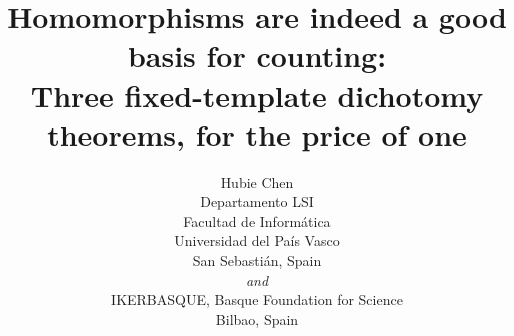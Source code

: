 \documentclass[11pt]{article}
\begin{document}
\title{Homomorphisms are indeed a good basis for counting:\\Three fixed-template dichotomy theorems, for the price of one}



\author{Hubie Chen\\
Departamento LSI\\
Facultad de Inform\'{a}tica\\
Universidad del Pa\'{i}s Vasco\\
San Sebasti\'{a}n, Spain\\
\emph{and}\\
 IKERBASQUE, Basque Foundation for Science\\
Bilbao, Spain\\}


\date{ } 

\maketitle




\newcommand{\confversion}[1]{}
\newcommand{\longversion}[1]{#1}




\newtheorem{theorem}{Theorem}[section]
\newtheorem{conjecture}[theorem]{Conjecture}
\newtheorem{corollary}[theorem]{Corollary}
\newtheorem{proposition}[theorem]{Proposition}
\newtheorem{prop}[theorem]{Proposition}
\newtheorem{lemma}[theorem]{Lemma}
\newtheorem{remarkcore}[theorem]{Remark}
\newtheorem{exercisecore}[theorem]{Exercise}
\newtheorem{examplecore}[theorem]{Example}
\newtheorem{assumptioncore}[theorem]{Assumption}

\newenvironment{assumption}
  {\begin{assumptioncore}\rm}
  {\hfill $\Box$\end{assumptioncore}}

\newenvironment{example}
  {\begin{examplecore}\rm}
  {\hfill $\Box$\end{examplecore}}

\newenvironment{exercise}
 {\begin{exercisecore}\rm}
 {\hfill $\Box$\end{exercisecore}}
\end{document}
